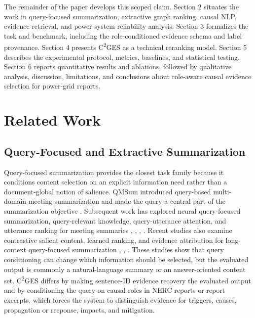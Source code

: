 \documentclass{ieeeaccess}
\begin{document}
The remainder of the paper develops this scoped claim. Section 2 situates the work in query-focused summarization, extractive graph ranking, causal NLP, evidence retrieval, and power-system reliability analysis. Section 3 formalizes the task and benchmark, including the role-conditioned evidence schema and label provenance. Section 4 presents C\textsuperscript{2}GES as a technical reranking model. Section 5 describes the experimental protocol, metrics, baselines, and statistical testing. Section 6 reports quantitative results and ablations, followed by qualitative analysis, discussion, limitations, and conclusions about role-aware causal evidence selection for power-grid reports.

\section{Related Work}

\label{sec:related_work}

\subsection{Query-Focused and Extractive Summarization}

\label{sec:query_focused_and_extractive_summarizati}

Query-focused summarization provides the closest task family because it conditions content selection on an explicit information need rather than a document-global notion of salience. QMSum introduced query-based multi-domain meeting summarization and made the query a central part of the summarization objective \cite{zhong2021qmsum}. Subsequent work has explored neural query-focused summarization, query-relevant knowledge, query-utterance attention, and utterance ranking for meeting summaries \cite{vig2022exploring}, \cite{yu2023improving}, \cite{liu2023queryutterance}, \cite{liu2023rank}. Recent studies also examine contrastive salient content, learned ranking, and evidence attribution for long-context query-focused summarization \cite{sotudeh2023qontsum}, \cite{sotudeh2024rank}, \cite{wright2025unstructured}. These studies show that query conditioning can change which information should be selected, but the evaluated output is commonly a natural-language summary or an answer-oriented content set. C\textsuperscript{2}GES differs by making sentence-ID evidence recovery the evaluated output and by conditioning the query on causal roles in NERC reports or report excerpts, which forces the system to distinguish evidence for triggers, causes, propagation or response, impacts, and mitigation.
\end{document}
